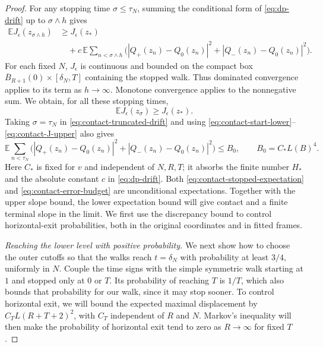 \documentclass[11pt]{article}
\numberwithin{equation}{section}
\theoremstyle{definition}
\theoremstyle{remark}
\begin{document}
\begin{proof}
For any stopping time $\sigma\le\tau_N$, summing the conditional form of
\eqref{eq:dp-drift} up to $\sigma\wedge h$ gives
\begin{equation}\label{eq:contact-truncated-drift}
\begin{split}
  \mathbb E J_\epsilon(z_{\sigma\wedge h})
  &\ge J_\epsilon(z_*)\\
  &\quad+c\,\mathbb E\sum_{n<\sigma\wedge h}
          \bigl(|Q_+(z_n)-Q_0(z_n)|^2+|Q_-(z_n)-Q_0(z_n)|^2\bigr).
\end{split}
\end{equation}
For each fixed $N$, $J_\epsilon$ is continuous and bounded on the compact
box $\overline B_{R+1}(0)\times[\delta_N,T]$ containing the stopped walk.
Thus dominated convergence applies to its
term as $h\to\infty$.  Monotone convergence applies to the nonnegative sum.
We obtain, for all these stopping times,
\begin{equation}\label{eq:contact-stopped-expectation}
  \mathbb E J_\epsilon(z_\sigma)\ge J_\epsilon(z_*).
\end{equation}
Taking $\sigma=\tau_N$ in \eqref{eq:contact-truncated-drift} and using
\eqref{eq:contact-start-lower}--\eqref{eq:contact-J-upper} also gives
\begin{equation}\label{eq:contact-error-budget}
  \mathbb E\sum_{n<\tau_N}
       \bigl(|Q_+(z_n)-Q_0(z_n)|^2+|Q_-(z_n)-Q_0(z_n)|^2\bigr)
  \le B_0,\qquad B_0=C_*L(B)^4.
\end{equation}
Here $C_*$ is fixed for $v$ and independent of $N,R,T$; it absorbs the
finite number $H_*$ and the absolute constant $c$ in \eqref{eq:dp-drift}.
Both \eqref{eq:contact-stopped-expectation} and
\eqref{eq:contact-error-budget} are unconditional expectations. Together
with the upper slope bound, the lower expectation bound will give contact
and a finite terminal slope in the limit. We first use the discrepancy
bound to control horizontal-exit probabilities, both in the original
coordinates and in fitted frames.

\medskip\noindent\emph{Reaching the lower level with positive probability.}
We next show how to choose the outer cutoffs so that the walks reach
$t=\delta_N$ with probability at least $3/4$, uniformly in $N$.
Couple the time signs with
the simple symmetric walk starting at $1$ and stopped only at $0$ or $T$.
Its probability of reaching $T$ is $1/T$, which also bounds that probability
for our walk, since it may stop sooner. To control horizontal exit, we will
bound the expected maximal displacement by $C_T L(R+T+2)^2$, with $C_T$ independent
of $R$ and $N$. Markov's inequality will then make the probability of
horizontal exit tend to zero as $R\to\infty$ for fixed $T$.


\end{proof}
\end{document}
